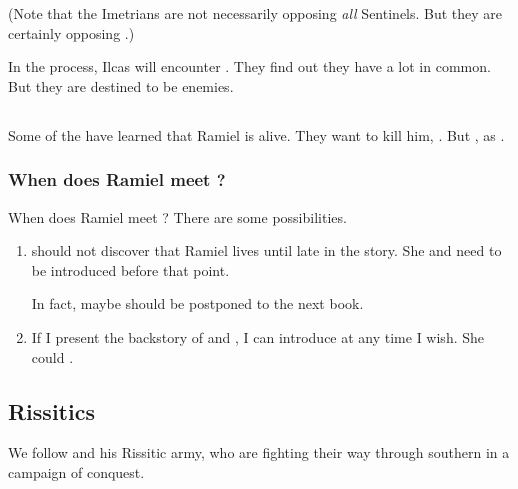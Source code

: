 (Note that the Imetrians are not necessarily opposing \emph{all} Sentinels. But they are certainly opposing \Secherdamon.) 

In the process, Ilcas will encounter \Narkiza. 
They find out they have a lot in common. 
But they are destined to be enemies. 









\subsection[Mystraacht]{\Mystraacht}
Some of the \Mystraacht{} have learned that Ramiel is alive. 
They want to kill him, . 
But , as . 





\subsubsection{When does Ramiel meet \Cishiel?}
When does Ramiel meet \Cishiel?
There are some possibilities. 

\begin{enumerate}
  \item 
    \Cishiel{} should not discover that Ramiel lives until late in the story. 
    She and \Dasteron{} need to be introduced before that point. 
    
    In fact, maybe \Cishiel{} should be postponed to the next book. 
  \item 
    If I present the backstory of \Cishiel and \Dasteron {}, I can introduce \Cishiel at any time I wish. 
    She could .
\end{enumerate}












\subsection{Rissitics}
We follow \Narkiza{} and his Rissitic army, who are fighting their way through southern \Velcad{} in a campaign of conquest. 

